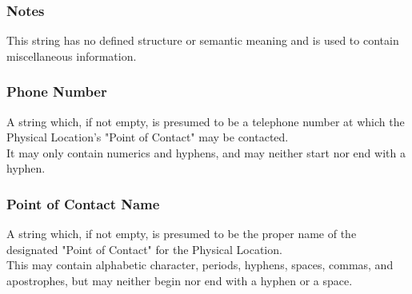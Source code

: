 \subsubsection{Notes}
This string has no defined structure or semantic meaning and is used to contain
miscellaneous information.

\subsubsection{Phone Number}
A string which, if not empty, is presumed to be a telephone number at which the
Physical Location's "Point of Contact" may be contacted.\\
It may only contain numerics and hyphens, and may neither start nor end with a
hyphen.

\subsubsection{Point of Contact Name}
A string which, if not empty, is presumed to be the proper name of the
designated "Point of Contact" for the Physical Location.\\
This may contain alphabetic character, periods, hyphens, spaces, commas, and
apostrophes, but may neither begin nor end with a hyphen or a space.
